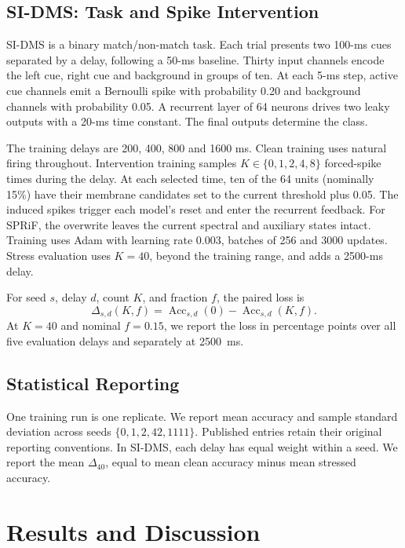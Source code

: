 \documentclass[letterpaper,journal]{IEEEtran}
\DeclareMathOperator{\Acc}{Acc}
\begin{document}
\subsection{SI-DMS: Task and Spike Intervention}
\label{sec:sidms}

SI-DMS is a binary match/non-match task. Each trial presents two 100-ms cues separated by a delay, following a 50-ms baseline. Thirty input channels encode the left cue, right cue and background in groups of ten. At each 5-ms step, active cue channels emit a Bernoulli spike with probability 0.20 and background channels with probability 0.05. A recurrent layer of 64 neurons drives two leaky outputs with a 20-ms time constant. The final outputs determine the class.

The training delays are 200, 400, 800 and 1600 ms. Clean training uses natural firing throughout. Intervention training samples $K\in\{0,1,2,4,8\}$ forced-spike times during the delay. At each selected time, ten of the 64 units (nominally 15\%) have their membrane candidates set to the current threshold plus 0.05. The induced spikes trigger each model's reset and enter the recurrent feedback. For SPRiF, the overwrite leaves the current spectral and auxiliary states intact. Training uses Adam with learning rate 0.003, batches of 256 and 3000 updates. Stress evaluation uses $K=40$, beyond the training range, and adds a 2500-ms delay.

For seed $s$, delay $d$, count $K$, and fraction $f$, the paired loss is
\begin{equation}
\Delta_{s,d}(K,f)=
\Acc_{s,d}(0)-\Acc_{s,d}(K,f).
\label{eq:paired_loss}
\end{equation}
At $K=40$ and nominal $f=0.15$, we report the loss in percentage points over all five evaluation delays and separately at 2500~ms.

\subsection{Statistical Reporting}
\label{sec:statistics}

One training run is one replicate. We report mean accuracy and sample standard deviation across seeds $\{0,1,2,42,1111\}$. Published entries retain their original reporting conventions. In SI-DMS, each delay has equal weight within a seed. We report the mean $\Delta_{40}$, equal to mean clean accuracy minus mean stressed accuracy.

\section{Results and Discussion}
\label{sec:results}
\end{document}
